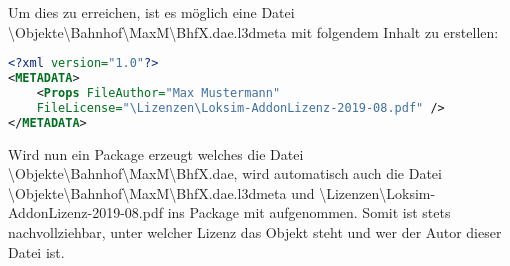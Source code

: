 Um dies zu erreichen, ist es möglich eine Datei 
\textbackslash Objekte\textbackslash\linebreak[0]Bahnhof\textbackslash\linebreak[0]MaxM\textbackslash BhfX.dae.l3dmeta 
mit folgendem Inhalt zu erstellen:

\begin{lstlisting}[language=XML]
<?xml version="1.0"?>
<METADATA>
    <Props FileAuthor="Max Mustermann" 
    FileLicense="\Lizenzen\Loksim-AddonLizenz-2019-08.pdf" />
</METADATA>
\end{lstlisting}

Wird nun ein Package erzeugt welches die Datei 
\textbackslash Objekte\textbackslash\linebreak[0]Bahnhof\textbackslash\linebreak[0]MaxM\textbackslash BhfX.dae, 
wird automatisch auch die Datei 
\textbackslash Objekte\textbackslash\linebreak[0]Bahnhof\textbackslash\linebreak[0]MaxM\textbackslash\linebreak[0]BhfX.dae.l3dmeta
und 
\textbackslash Lizenzen\textbackslash\linebreak[0]Loksim-AddonLizenz-2019-08.pdf 
ins Package mit aufgenommen. Somit ist stets nachvollziehbar, unter welcher Lizenz das Objekt steht
und wer der Autor dieser Datei ist.